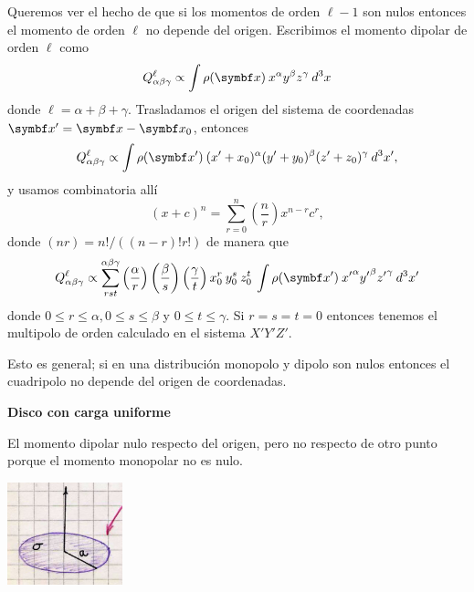\documentclass[10pt,oneside]{CBFT_book}
\begin{document}
Queremos ver el hecho de que si los momentos de orden $\ell-1$ son nulos entonces el momento de orden $\ell$
no depende del origen.
Escribimos el momento dipolar de orden $\ell$ como
\[
	Q^{\ell}_{\alpha\beta\gamma} \propto \int \rho(\vbx) \: x^\alpha y^\beta z^\gamma  \: d^3x
\]
donde $\ell = \alpha + \beta + \gamma$.
Trasladamos el origen del sistema de coordenadas $\vbx'= \vbx - \vbx_0$, entonces
\[
	Q^{\ell}_{\alpha\beta\gamma} \propto \int \rho(\vbx') \: (x'+x_0)^\alpha (y'+y_0)^\beta (z'+z_0)^\gamma  \: d^3x',
\]
y usamos combinatoria allí
\[
	( x + c )^n = \sum_{r=0}^n \left( \frac{n}{r} \right) x^{n-r} c^r,
\]
donde $(n r) = n! / ( (n-r)! r! )$ de manera que 
\[
	Q^{\ell}_{\alpha\beta\gamma} \propto \sum_{rst}^{\alpha\beta\gamma} 
	\left( \frac{\alpha}{r} \right) \left( \frac{\beta}{s} \right) \left( \frac{\gamma}{t} \right)
	x_0^r \: y_0^s \: z_0^t \:
	\int \rho(\vbx') \: {x'}^\alpha {y'}^\beta {z'}^\gamma  \: d^3x'
\]
donde $0\leq r\leq \alpha, 0\leq s\leq \beta$ y $0\leq t\leq \gamma$.
Si $r=s=t=0$ entonces tenemos el multipolo de orden \ell calculado en el sistema $X'Y'Z'$.

Esto es general; si en una distribución monopolo y dipolo son nulos entonces el cuadripolo no depende
del origen de coordenadas.  

\begin{ejemplo}{\bf Disco con carga uniforme}

El momento dipolar nulo respecto del origen, pero no respecto de otro punto porque el momento monopolar 
no es nulo.

\includegraphics[width=0.25\textwidth]{images/fig_ft1_disco_cargado.jpg}	 


\end{ejemplo}
\end{document}
